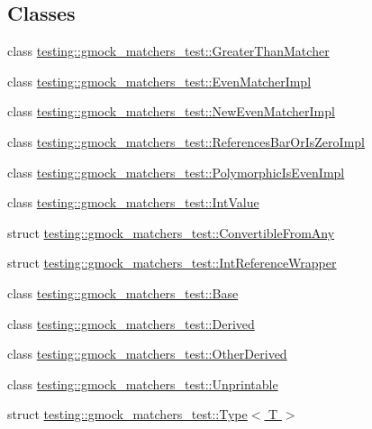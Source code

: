 \subsection*{Classes}
\begin{DoxyCompactItemize}
\item 
class \hyperlink{classtesting_1_1gmock__matchers__test_1_1GreaterThanMatcher}{testing\+::gmock\+\_\+matchers\+\_\+test\+::\+Greater\+Than\+Matcher}
\item 
class \hyperlink{classtesting_1_1gmock__matchers__test_1_1EvenMatcherImpl}{testing\+::gmock\+\_\+matchers\+\_\+test\+::\+Even\+Matcher\+Impl}
\item 
class \hyperlink{classtesting_1_1gmock__matchers__test_1_1NewEvenMatcherImpl}{testing\+::gmock\+\_\+matchers\+\_\+test\+::\+New\+Even\+Matcher\+Impl}
\item 
class \hyperlink{classtesting_1_1gmock__matchers__test_1_1ReferencesBarOrIsZeroImpl}{testing\+::gmock\+\_\+matchers\+\_\+test\+::\+References\+Bar\+Or\+Is\+Zero\+Impl}
\item 
class \hyperlink{classtesting_1_1gmock__matchers__test_1_1PolymorphicIsEvenImpl}{testing\+::gmock\+\_\+matchers\+\_\+test\+::\+Polymorphic\+Is\+Even\+Impl}
\item 
class \hyperlink{classtesting_1_1gmock__matchers__test_1_1IntValue}{testing\+::gmock\+\_\+matchers\+\_\+test\+::\+Int\+Value}
\item 
struct \hyperlink{structtesting_1_1gmock__matchers__test_1_1ConvertibleFromAny}{testing\+::gmock\+\_\+matchers\+\_\+test\+::\+Convertible\+From\+Any}
\item 
struct \hyperlink{structtesting_1_1gmock__matchers__test_1_1IntReferenceWrapper}{testing\+::gmock\+\_\+matchers\+\_\+test\+::\+Int\+Reference\+Wrapper}
\item 
class \hyperlink{classtesting_1_1gmock__matchers__test_1_1Base}{testing\+::gmock\+\_\+matchers\+\_\+test\+::\+Base}
\item 
class \hyperlink{classtesting_1_1gmock__matchers__test_1_1Derived}{testing\+::gmock\+\_\+matchers\+\_\+test\+::\+Derived}
\item 
class \hyperlink{classtesting_1_1gmock__matchers__test_1_1OtherDerived}{testing\+::gmock\+\_\+matchers\+\_\+test\+::\+Other\+Derived}
\item 
class \hyperlink{classtesting_1_1gmock__matchers__test_1_1Unprintable}{testing\+::gmock\+\_\+matchers\+\_\+test\+::\+Unprintable}
\item 
struct \hyperlink{structtesting_1_1gmock__matchers__test_1_1Type}{testing\+::gmock\+\_\+matchers\+\_\+test\+::\+Type$<$ T $>$}

\end{DoxyCompactItemize}

